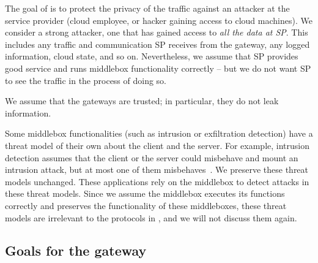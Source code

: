 The goal of \sys is to protect the privacy of the traffic against an attacker at the service provider  
(cloud employee, or hacker gaining access to cloud machines). 
We consider a strong  attacker, one that has gained access to {\em all the data at SP}.
This includes any traffic and communication SP receives from the 
gateway, any logged information, cloud state, and so on. Nevertheless, we assume that 
SP provides good service and runs middlebox functionality correctly -- but we do not want SP to 
see the traffic in the process of doing so.  

We assume that the gateways are trusted; in particular,  they do not leak information.


Some middlebox functionalities (such as intrusion or exfiltration detection) have a threat model
of their own about the client and the server. For example, intrusion detection assumes that 
the client or the server could misbehave and mount an intrusion attack, but at most one of them misbehaves~\cite{Bro}.  
We preserve these threat models unchanged. These applications rely
on the middlebox to detect attacks in these threat models. Since we assume the middlebox executes
its functions correctly and \sys preserves the functionality of these middleboxes, 
these threat models are irrelevant to the protocols in \sys, and we will not discuss them again. 


\subsection{Goals for the gateway}

